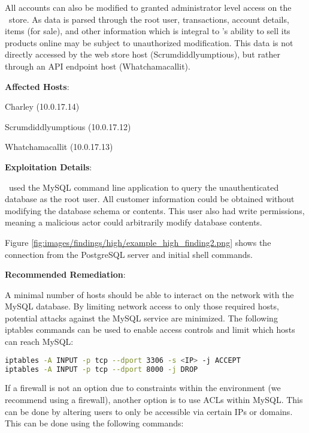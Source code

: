     All accounts can also be modified to granted administrator level access on the \cptc\ store. As data is parsed through the root user, transactions, account details, items (for sale), and other information which is integral to \cptc's ability to sell its products online may be subject to unauthorized modification. This data is not directly accessed by the web store host (Scrumdiddlyumptious), but rather through an API endpoint host (Whatchamacallit).
    \noindent
    
    
    \textbf{Affected Hosts}:
    
    Charley (10.0.17.14)
    
    Scrumdiddlyumptious (10.0.17.12)
    
    Whatchamacallit (10.0.17.13)

\noindent
\textbf{Exploitation Details}:

    \teamname\ used the MySQL command line application to query the unauthenticated database as the root user.  All customer information could be obtained without modifying the database schema or contents.  This user also had write permissions, meaning a malicious actor could arbitrarily modify database contents.
    
    Figure \ref{fig:images/findings/high/example_high_finding2.png} shows the connection from the PostgreSQL server and initial shell commands.
    

\noindent
\textbf{Recommended Remediation}:

A minimal number of hosts should be able to interact on the network with the MySQL database. By limiting network access to only those required hosts, potential attacks against the MySQL service are minimized.  The following iptables commands can be used to enable access controls and limit which hosts can reach MySQL:

\begin{lstlisting}[language=bash,frame=single,showstringspaces=false]
iptables -A INPUT -p tcp --dport 3306 -s <IP> -j ACCEPT
iptables -A INPUT -p tcp --dport 8000 -j DROP
\end{lstlisting}

If a firewall is not an option due to constraints within the environment (we recommend using a firewall), another option is to use ACLs within MySQL. This can be done by altering users to only be accessible via certain IPs or domains. This can be done using the following commands:

